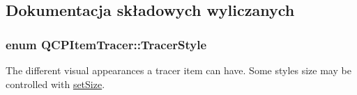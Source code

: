 \subsection{Dokumentacja składowych wyliczanych}
\subsubsection[{\texorpdfstring{Tracer\+Style}{TracerStyle}}]{\setlength{\rightskip}{0pt plus 5cm}enum {\bf Q\+C\+P\+Item\+Tracer\+::\+Tracer\+Style}}\hypertarget{class_q_c_p_item_tracer_a2f05ddb13978036f902ca3ab47076500}{}\label{class_q_c_p_item_tracer_a2f05ddb13978036f902ca3ab47076500}
The different visual appearances a tracer item can have. Some styles size may be controlled with \hyperlink{class_q_c_p_item_tracer_ae47fe0617f5fef5fdb766999569be10a}{set\+Size}.


